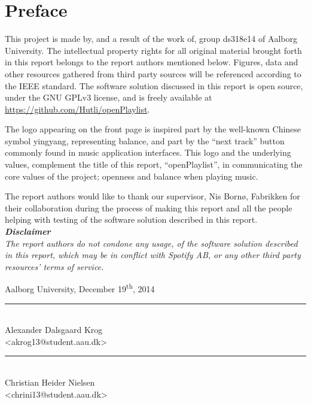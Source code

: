 \chapter{Preface}\label{ch:preface}
 \thispagestyle{empty}
This project is made by, and a result of the work of, group ds318e14 of Aalborg University. The intellectual property rights for all original material brought forth in this report belongs to the report authors mentioned below. Figures, data and other resources gathered from third party sources will be referenced according to the IEEE standard. The software solution discussed in this report is open source, under the GNU GPLv3 license, and is freely available at \url{https://github.com/Hutli/openPlaylist}.

The logo appearing on the front page is inspired part by the well-known Chinese symbol yingyang, representing balance, and part by the \enquote{next track} button commonly found in music application interfaces. This logo and the underlying values, complement the title of this report, \enquote{openPlaylist}, in communicating the core values of the project; openness and balance when playing music.

The report authors would like to thank our supervisor, Nis Bornø, Fabrikken for their collaboration during the process of making this report and all the people helping with testing
of the software solution described in this report.\\

\noindent
\textit{
\textbf{Disclaimer}\\
The report authors do not condone any usage, of the software solution described in this report, which may be in conflict with Spotify AB, or any other third party resources' terms of service.}

\vspace{\baselineskip}\hfill Aalborg University, December 19\textsuperscript{th}, 2014
\vfill

\noindent
\begin{minipage}[b]{0.45\textwidth}
 \centering
 \rule{\textwidth}{0.5pt}\\
  Alexander Dalsgaard Krog\\
 {\footnotesize <akrog13@student.aau.dk>}
\end{minipage}
\hfill
\begin{minipage}[b]{0.45\textwidth}
 \centering
 \rule{\textwidth}{0.5pt}\\
  Christian Heider Nielsen\\
 {\footnotesize <chrini13@student.aau.dk>}
\end{minipage}
\vspace{3\baselineskip}

